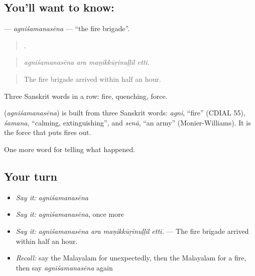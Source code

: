 \subsection*{You'll want to know: }
\textbf{} — \emph{agniśamanasēna} — \textquotedblleft{}the fire brigade\textquotedblright{}.

\begin{quote}
   .
\end{quote}

\begin{quote}
\emph{agniśamanasēna ara maṇikkūṟinuḷḷil etti.}
\end{quote}

\begin{quote}
The fire brigade arrived within half an hour.
\end{quote}

Three Sanskrit words in a row: fire, quenching, force.

\begin{cousinweb}
\textbf{} (\emph{agniśamanasēna}) is built from three Sanskrit words: \emph{agni}, \textquotedblleft{}fire\textquotedblright{} (CDIAL 55), \emph{śamana}, \textquotedblleft{}calming, extinguishing\textquotedblright{}, and \emph{senā}, \textquotedblleft{}an army\textquotedblright{} (Monier-Williams). It is the force that puts fires out.
\end{cousinweb}

\begin{grammarlens}[title={What you've built}]
One more word for telling what happened.
\end{grammarlens}

\subsection*{Your turn}
\begin{itemize}
\raggedright
  \item \emph{Say it:} \emph{agniśamanasēna}
  \item \emph{Say it:} \emph{agniśamanasēna}, once more
  \item \emph{Say it:} \emph{agniśamanasēna ara maṇikkūṟinuḷḷil etti.} — The fire brigade arrived within half an hour.
  \item \emph{Recall:} say the Malayalam for unexpectedly, then the Malayalam for a fire, then say \emph{agniśamanasēna} again
\end{itemize}

